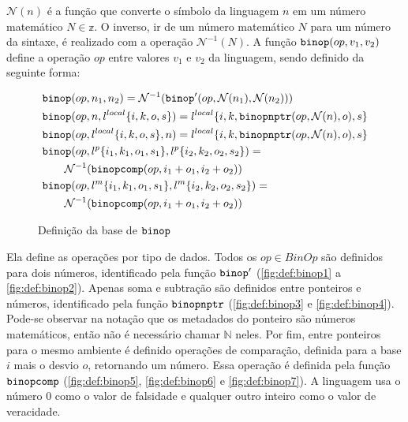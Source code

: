 $\mathcal{N}(n)$ é a função que converte o símbolo da linguagem $n$ em um número matemático $N \in \mathbb{z}$. O inverso, ir de um número matemático $N$ para um número da sintaxe, é realizado com a operação $\mathcal{N}^{-1}(N)$. A função $\texttt{binop}(op, v_1, v_2)$ define a operação $op$ entre valores $v_1$ e $v_2$ da linguagem, sendo definido da seguinte forma:

\begin{figure}[ht]
	\begin{align}
		& \texttt{binop}(op, n_1, n_2) = \mathcal{N}^{-1}(\texttt{binop}'(op, \mathcal{N}(n_1), \mathcal{N}(n_2))) \\
		& \texttt{binop}(op, n, l^{local}\{i, k, o, s\}) = l^{local}\{i, k, \texttt{binopnptr}(op, \mathcal{N}(n), o), s\} \\
		& \texttt{binop}(op, l^{local}\{i, k, o, s\}, n) = l^{local}\{i, k, \texttt{binopnptr}(op, \mathcal{N}(n), o), s\} \\
		& \texttt{binop}(op, l^p\{i_1, k_1, o_1, s_1\}, l^p\{i_2, k_2, o_2, s_2\}) = \nonumber \\ 
		&\quad\quad\mathcal{N}^{-1}(\texttt{binopcomp}(op, i_1 + o_1, i_2 + o_2)) \\
		& \texttt{binop}(op, l^m\{i_1, k_1, o_1, s_1\}, l^m\{i_2, k_2, o_2, s_2\}) = \nonumber \\ 
		&\quad\quad\mathcal{N}^{-1}(\texttt{binopcomp}(op, i_1 + o_1, i_2 + o_2)) 
	\end{align}
	\caption{Definição da base de $\texttt{binop}$}
	\label{fig:def:binop:base}
\end{figure}

Ela define as operações por tipo de dados. Todos os $op \in BinOp$ são definidos para dois números, identificado pela função $\texttt{binop}'$ (\ref{fig:def:binop1} a \ref{fig:def:binop2}). Apenas soma e subtração são definidos entre ponteiros e números, identificado pela função $\texttt{binopnptr}$ (\ref{fig:def:binop3} e \ref{fig:def:binop4}). Pode-se observar na notação que os metadados do ponteiro são números matemáticos, então não é necessário chamar $\mathbb{N}$ neles. Por fim, entre ponteiros para o mesmo ambiente é definido operações de comparação, definida para a base $i$ mais o desvio $o$, retornando um número. Essa operação é definida pela função $\texttt{binopcomp}$ (\ref{fig:def:binop5}, \ref{fig:def:binop6} e \ref{fig:def:binop7}). A linguagem usa o número 0 como o valor de falsidade e qualquer outro inteiro como o valor de veracidade.

